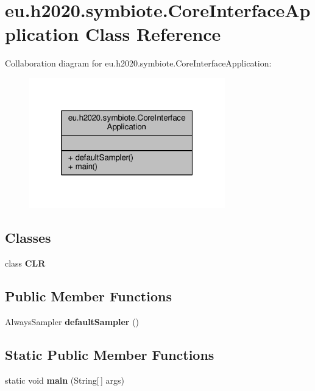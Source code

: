 \hypertarget{classeu_1_1h2020_1_1symbiote_1_1CoreInterfaceApplication}{}\section{eu.\+h2020.\+symbiote.\+Core\+Interface\+Application Class Reference}
\label{classeu_1_1h2020_1_1symbiote_1_1CoreInterfaceApplication}


Collaboration diagram for eu.\+h2020.\+symbiote.\+Core\+Interface\+Application\+:
\nopagebreak
\begin{figure}[H]
\begin{center}
\leavevmode
\includegraphics[width=241pt]{classeu_1_1h2020_1_1symbiote_1_1CoreInterfaceApplication__coll__graph}
\end{center}
\end{figure}
\subsection*{Classes}
\begin{DoxyCompactItemize}
\item 
class {\bfseries C\+LR}
\end{DoxyCompactItemize}
\subsection*{Public Member Functions}
\begin{DoxyCompactItemize}
\item 
Always\+Sampler {\bfseries default\+Sampler} ()\hypertarget{classeu_1_1h2020_1_1symbiote_1_1CoreInterfaceApplication_a471bb0daa5bb1e4f52cdca00b81fae69}{}\label{classeu_1_1h2020_1_1symbiote_1_1CoreInterfaceApplication_a471bb0daa5bb1e4f52cdca00b81fae69}

\end{DoxyCompactItemize}
\subsection*{Static Public Member Functions}
\begin{DoxyCompactItemize}
\item 
static void {\bfseries main} (String\mbox{[}$\,$\mbox{]} args)\hypertarget{classeu_1_1h2020_1_1symbiote_1_1CoreInterfaceApplication_a7c7036fb52bab67977fa57f6200b0b7e}{}\label{classeu_1_1h2020_1_1symbiote_1_1CoreInterfaceApplication_a7c7036fb52bab67977fa57f6200b0b7e}

\end{DoxyCompactItemize}


